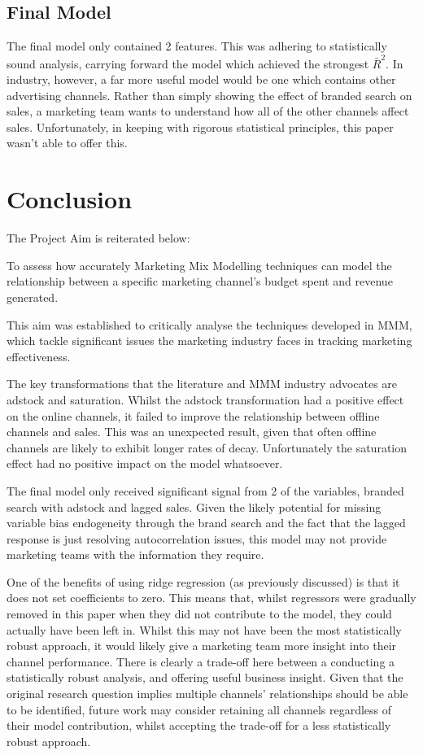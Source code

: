 \documentclass[11pt, a4paper]{article}
\begin{document}
\subsection{Final Model}

The final model only contained 2 features. This was adhering to statistically sound analysis, carrying forward the model which achieved the strongest $\bar{R}^2$. In industry, however, a far more useful model would be one which contains other advertising channels. Rather than simply showing the effect of branded search on sales, a marketing team wants to understand how all of the other channels affect sales. Unfortunately, in keeping with rigorous statistical principles, this paper wasn’t able to offer this. 

\section{Conclusion}

The Project Aim is reiterated below: 

To assess how accurately Marketing Mix Modelling techniques can model the relationship between a specific marketing channel’s budget spent and revenue generated.

This aim was established to critically analyse the techniques developed in MMM, which tackle significant issues the marketing industry faces in tracking marketing effectiveness. 

The key transformations that the literature and MMM industry advocates are adstock and saturation. Whilst the adstock transformation had a positive effect on the online channels, it failed to improve the relationship between offline channels and sales. This was an unexpected result, given that often offline channels are likely to exhibit longer rates of decay. Unfortunately the saturation effect had no positive impact on the model whatsoever. 

The final model only received significant signal from 2 of the variables, branded search with adstock and lagged sales. Given the likely potential for missing variable bias endogeneity through the brand search and the fact that the lagged response is just resolving autocorrelation issues, this model may not provide marketing teams with the information they require. 

One of the benefits of using ridge regression (as previously discussed) is that it does not set coefficients to zero. This means that, whilst regressors were gradually removed in this paper when they did not contribute to the model, they could actually have been left in. Whilst this may not have been the most statistically robust approach, it would likely give a marketing team more insight into their channel performance. There is clearly a trade-off here between a conducting a statistically robust analysis, and offering useful business insight. Given that the original research question implies multiple channels' relationships should be able to be identified, future work may consider retaining all channels regardless of their model contribution, whilst accepting the trade-off for a less statistically robust approach.
\end{document}
